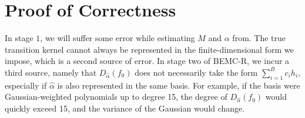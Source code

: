 \documentclass{article}
\begin{document}
\section{Proof of Correctness}
In stage $1$, we will suffer some error while estimating $M$ and $\alpha$ from. The true transition kernel cannot always be represented in the finite-dimensional form we impose, which is a second source of error. In stage two of BEMC-R, we incur a third source, namely that $D_{\hat{\alpha}}(f_0)$ does not necessarily take the form $\sum_{i=1}^B c_i h_i$, especially if $\hat{\alpha}$ is also represented in the same basis. For example, if the basis were Gaussian-weighted polynomials up to degree 15, the degree of $D_{\hat{\alpha}}(f_0)$ would quickly exceed 15, and the variance of the Gaussian would change. 



\end{document}
